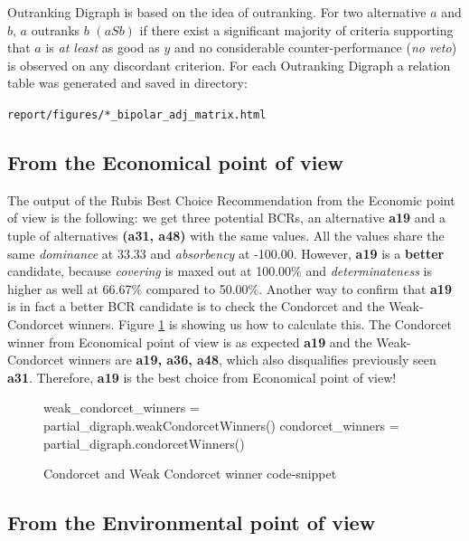 \documentclass[a4paper]{article}
\begin{document}
Outranking Digraph is based on the idea of outranking. For two alternative $a$ and $b$, $a$ outranks $b$ $(a S b)$ if there exist a significant majority of criteria supporting that $a$ is \emph{at least} as good as $y$ and no considerable counter-performance (\emph{no veto}) is observed on any discordant criterion. For each Outranking Digraph a relation table was generated and saved in directory:

\texttt{report/figures/*\_bipolar\_adj\_matrix.html} 

\subsection{From the Economical point of view}

The output of the Rubis Best Choice Recommendation from the Economic point of view is the following: we get three potential BCRs, an alternative \textbf{a19} and a tuple of alternatives \textbf{(a31, a48)} with the same values. All the values share the same \emph{dominance} at 33.33 and \emph{absorbency} at -100.00. However, \textbf{a19} is a \textbf{better} candidate, because \emph{covering} is maxed out at 100.00\% and \emph{determinateness} is higher as well at 66.67\% compared to 50.00\%. Another way to confirm that \textbf{a19} is in fact a better BCR candidate is to check the Condorcet and the Weak-Condorcet winners. Figure \ref{lst:condo} is showing us how to calculate this. The Condorcet winner from Economical point of view is as expected \textbf{a19} and the Weak-Condorcet winners are \textbf{a19, a36, a48}, which also disqualifies previously seen \textbf{a31}. Therefore, \textbf{a19} is the best choice from Economical point of view!

\begin{figure}[H]
	\begin{center}
		\begin{python}
weak_condorcet_winners = partial_digraph.weakCondorcetWinners()
condorcet_winners      = partial_digraph.condorcetWinners()
		\end{python}
	\end{center}
	\caption{Condorcet and Weak Condorcet winner code-snippet}
	\label{lst:condo}
\end{figure}



\subsection{From the Environmental point of view}
\label{sec:env}
\end{document}

